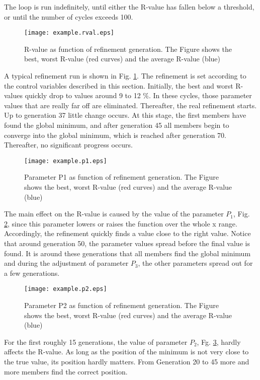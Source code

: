 The loop is run indefinitely, until either the R-value has fallen
below a threshold, or until the number of cycles exceeds 100.

\begin{figure}
   \texttt{[image: example.rval.eps]}
   \caption{R-value as function of refinement generation. The Figure
            shows the best, worst R-value (red curves) and the average
            R-value (blue)}
   \label{fexa-rval}
\end{figure}

A typical refinement run is shown in Fig. \ref{fexa-rval}. The
refinement is set according to the control variables described in 
this section. Initially, the best and worst R-values quickly drop
to values around 9 to 12 \%. In these cycles, those parameter 
values that are really far off are eliminated. Thereafter, the 
real refinement starts. Up to generation 37 little change occurs.
At this stage, the first members have found the global minimum, 
and after generation 45 all members begin to converge into the 
global minimum, which is reached after generation 70. Thereafter,
no significant progress occurs.

\begin{figure}
   \texttt{[image: example.p1.eps]}
   \caption{Parameter P1 as function of refinement generation. The Figure
            shows the best, worst R-value (red curves) and the average
            R-value (blue)}
   \label{fexa-p1}
\end{figure}

The main effect on the R-value is caused by the value of the parameter 
$P_{1}$, Fig. \ref{fexa-p1}, since this parameter lowers or raises 
the function over the 
whole x range. Accordingly, the refinement quickly finds a value close
to the right value. Notice that around generation 50, the parameter values
spread before the final value is found. It is around these generations
that all members find the global minimum and during the adjustment of
parameter $P_{3}$, the other parameters spread out for a few generations.

\begin{figure}
   \texttt{[image: example.p2.eps]}
   \caption{Parameter P2 as function of refinement generation. The Figure
            shows the best, worst R-value (red curves) and the average
            R-value (blue)}
   \label{fexa-p2}
\end{figure}

For the first roughly 15 generations, the value of parameter $P_{2}$,
Fg. \ref{fexa-p2}, hardly affects the R-value. As long as the position 
of the minimum is
not very close to the true value, its position hardly matters. 
From Generation 20 to 45 more and more members find the correct 
position.


